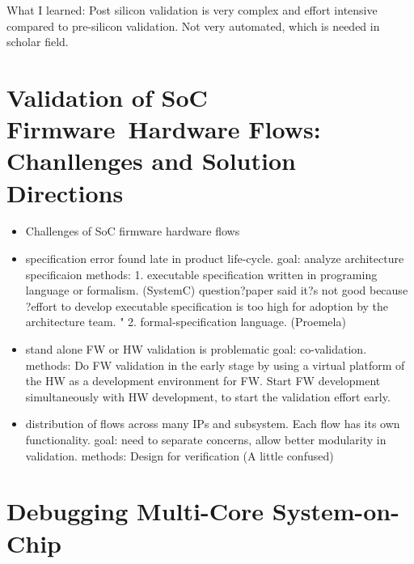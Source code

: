 \documentclass[conference]{IEEEtran}
\begin{document}
What I learned:
Post silicon validation is very complex and effort intensive compared to pre-silicon validation. Not very automated, which is needed in scholar field.


\section{Validation of SoC Firmware~Hardware Flows: Chanllenges and Solution Directions ~\cite{fw}}
\begin{itemize}
	\item Challenges of SoC firmware hardware flows
	\item specification error found late in product life-cycle.
		goal: analyze architecture specificaion
		methods: 1. executable specification written in programing language or formalism. (SystemC)
				question?paper said it?s not good because ?effort to develop executable specification is too high for adoption by the 						architecture team. "
				2. formal-specification language. (Proemela)

	\item stand alone FW or HW validation is problematic
		goal: co-validation. 
		methods: Do FW validation in the early stage by using a virtual platform of the HW as a development environment for FW. Start FW 			development simultaneously with HW development, to start the validation effort early.

	\item distribution of flows across many IPs and subsystem. Each flow has its own functionality.
		goal: need to separate concerns, allow better modularity in validation.
		methods: Design for verification
				(A little confused)
\end{itemize}

\section{Debugging Multi-Core System-on-Chip}
\end{document}
